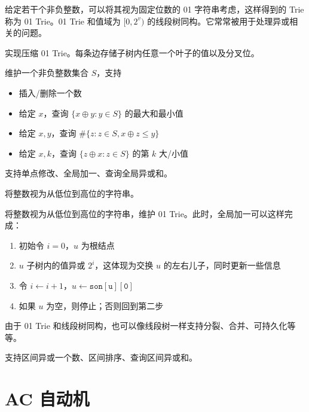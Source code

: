 给定若干个非负整数，可以将其视为固定位数的 01 字符串考虑，这样得到的 Trie 称为 01 Trie。01 Trie 和值域为 $[0,2^v)$ 的线段树同构。它常常被用于处理异或相关的问题。

\begin{exercise}
   实现压缩 01 Trie。每条边存储子树内任意一个叶子的值以及分叉位。 
\end{exercise}

\begin{exercise}
    维护一个非负整数集合 $S$，支持
    \begin{itemize}
        \item 插入/删除一个数
        \item 给定 $x$，查询 $\{x\oplus y:y\in S\}$ 的最大和最小值
        \item 给定 $x,y$，查询 $\#\{z : z \in S, x \oplus z \le  y\}$
        \item 给定 $x,k$，查询 $\{z\oplus x : z \in S\}$ 的第 $k$ 大/小值
    \end{itemize}
\end{exercise}

\begin{exercise}[P11872]
    支持单点修改、全局加一、查询全局异或和。
    \begin{hint}
        将整数视为从低位到高位的字符串。
    \end{hint}
\end{exercise}
\begin{solution}
    将整数视为从低位到高位的字符串，维护 01 Trie。此时，全局加一可以这样完成：
    \begin{enumerate}
        \item 初始令 $i=0$，$u$ 为根结点
        \item $u$ 子树内的值异或 $2^i$，这体现为交换 $u$ 的左右儿子，同时更新一些信息
        \item 令 $i\gets i+1$，$u\gets \mathtt{son[u][0]}$
        \item 如果 $u$ 为空，则停止；否则回到第二步
    \end{enumerate}
\end{solution}

由于 01 Trie 和线段树同构，也可以像线段树一样支持分裂、合并、可持久化等等。
\begin{exercise}[{[Ynoi2013] Ynoi}]
    支持区间异或一个数、区间排序、查询区间异或和。
\end{exercise}

\section{AC 自动机}

